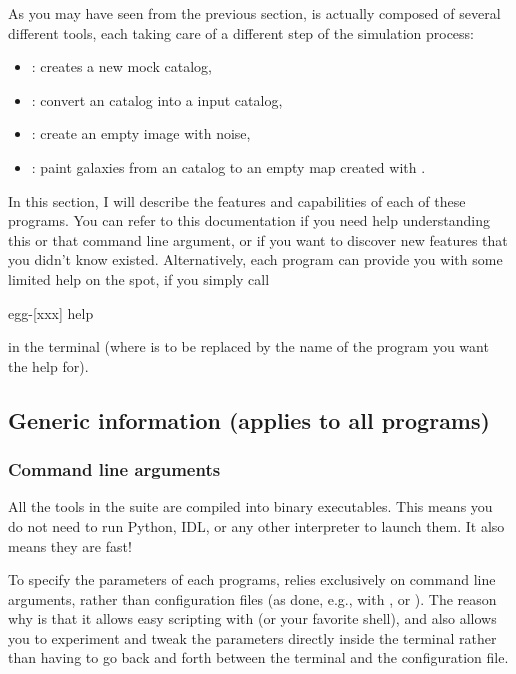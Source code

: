 As you may have seen from the previous section, \egg is actually composed of several different tools, each taking care of a different step of the simulation process:
\begin{itemize}
\item {}: creates a new \egg mock catalog,
\item {}: convert an \egg catalog into a \skymaker input catalog,
\item {}: create an empty image with noise,
\item {}: paint galaxies from an \egg catalog to an empty map created with .
\end{itemize}

In this section, I will describe the features and capabilities of each of these programs. You can refer to this documentation if you need help understanding this or that command line argument, or if you want to discover new features that you didn't know existed. Alternatively, each program can provide you with some limited help on the spot, if you simply call
\begin{bashcode}
egg-[xxx] help
\end{bashcode}
in the terminal (where \bashinline{[xxx]} is to be replaced by the name of the program you want the help for).

\subsection{Generic information (applies to all programs)}

\subsubsection{Command line arguments}

All the tools in the \egg suite are compiled into binary executables. This means you do not need to run Python, IDL, or any other interpreter to launch them. It also means they are fast!

To specify the parameters of each programs, \egg relies exclusively on command line arguments, rather than configuration files (as done, e.g., with \tphot, \skymaker or \sextractor). The reason why is that it allows easy scripting with \bash (or your favorite shell), and also allows you to experiment and tweak the parameters directly inside the terminal rather than having to go back and forth between the terminal and the configuration file.

